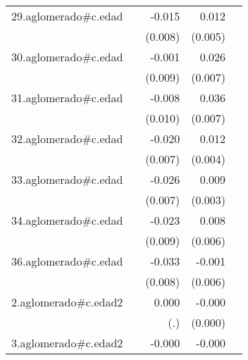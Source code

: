 {\begin{longtable}{l*{4}{D{.}{.}{-1}}}
\addlinespace
29.aglomerado#c.edad&                     &      -0.015         &       0.012\sym{*}  &                     \\
            &                     &     (0.008)         &     (0.005)         &                     \\
\addlinespace
30.aglomerado#c.edad&                     &      -0.001         &       0.026\sym{***}&                     \\
            &                     &     (0.009)         &     (0.007)         &                     \\
\addlinespace
31.aglomerado#c.edad&                     &      -0.008         &       0.036\sym{***}&                     \\
            &                     &     (0.010)         &     (0.007)         &                     \\
\addlinespace
32.aglomerado#c.edad&                     &      -0.020\sym{**} &       0.012\sym{**} &                     \\
            &                     &     (0.007)         &     (0.004)         &                     \\
\addlinespace
33.aglomerado#c.edad&                     &      -0.026\sym{***}&       0.009\sym{***}&                     \\
            &                     &     (0.007)         &     (0.003)         &                     \\
\addlinespace
34.aglomerado#c.edad&                     &      -0.023\sym{**} &       0.008         &                     \\
            &                     &     (0.009)         &     (0.006)         &                     \\
\addlinespace
36.aglomerado#c.edad&                     &      -0.033\sym{***}&      -0.001         &                     \\
            &                     &     (0.008)         &     (0.006)         &                     \\
\addlinespace
2.aglomerado#c.edad2&                     &       0.000         &      -0.000\sym{**} &                     \\
            &                     &         (.)         &     (0.000)         &                     \\
\addlinespace
3.aglomerado#c.edad2&                     &      -0.000         &      -0.000\sym{***}&                     \\

\end{longtable}}

